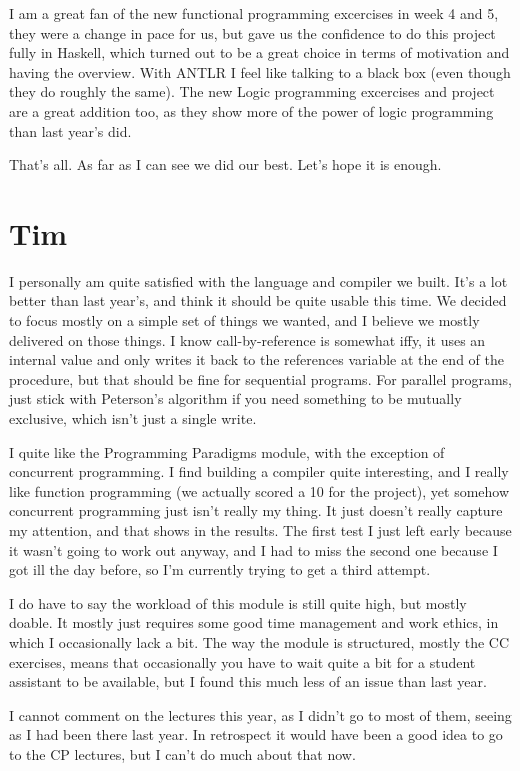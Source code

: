 \documentclass[twoside]{report}
\begin{document}
I am a great fan of the new functional programming excercises in week 4 and 5, they were a change in pace for us, but gave us the confidence to do this project fully in Haskell, which turned out to be a great choice in terms of motivation and having the overview. With ANTLR I feel like talking to a black box (even though they do roughly the same). The new Logic programming excercises and project are a great addition too, as they show more of the power of logic programming than last year's did.

That's all. As far as I can see we did our best. Let's hope it is enough.

\section{Tim}
I personally am quite satisfied with the language and compiler we built. It's a lot better than last year's, and think it should be quite usable this time. We decided to focus mostly on a simple set of things we wanted, and I believe we mostly delivered on those things. I know call-by-reference is somewhat iffy, it uses an internal value and only writes it back to the references variable at the end of the procedure, but that should be fine for sequential programs. For parallel programs, just stick with Peterson's algorithm if you need something to be mutually exclusive, which isn't just a single write.

I quite like the Programming Paradigms module, with the exception of concurrent programming. I find building a compiler quite interesting, and I really like function programming (we actually scored a 10 for the project), yet somehow concurrent programming just isn't really my thing. It just doesn't really capture my attention, and that shows in the results. The first test I just left early because it wasn't going to work out anyway, and I had to miss the second one because I got ill the day before, so I'm currently trying to get a third attempt.

I do have to say the workload of this module is still quite high, but mostly doable. It mostly just requires some good time management and work ethics, in which I occasionally lack a bit. The way the module is structured, mostly the CC exercises, means that occasionally you have to wait quite a bit for a student assistant to be available, but I found this much less of an issue than last year.

I cannot comment on the lectures this year, as I didn't go to most of them, seeing as I had been there last year. In retrospect it would have been a good idea to go to the CP lectures, but I can't do much about that now.
\end{document}
